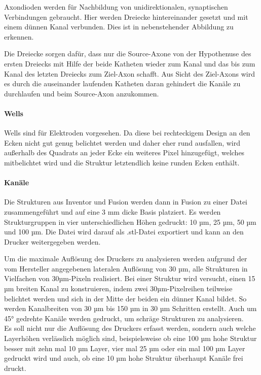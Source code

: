 Axondioden werden für Nachbildung von unidirektionalen, synaptischen Verbindungen gebraucht. Hier werden Dreiecke hintereinander gesetzt und mit einem dünnen Kanal verbunden. Dies ist in nebenstehender Abbildung zu erkennen.

Die Dreiecke sorgen dafür, dass nur die Source-Axone von der Hypothenuse des ersten Dreiecks mit Hilfe der beide Katheten wieder zum Kanal und das bis zum Kanal des letzten Dreiecks zum Ziel-Axon schafft. Aus Sicht des Ziel-Axons wird es durch die auseinander laufenden Katheten daran gehindert die Kanäle zu durchlaufen und beim Source-Axon anzukommen.\cite{Gladkov2017}

\paragraph{Wells\\}

Wells sind für Elektroden vorgesehen. Da diese bei rechteckigem Design an den Ecken nicht gut genug belichtet werden und daher eher rund ausfallen, wird außerhalb des Quadrats an jeder Ecke ein weiteres Pixel hinzugefügt, welches mitbelichtet wird und die Struktur letztendlich keine runden Ecken enthält.  

\paragraph{Kanäle\\}

Die Strukturen aus Inventor und Fusion werden dann in Fusion zu einer Datei zusammengeführt und auf eine 3 mm dicke Basis platziert. Es werden Strukturgruppen in vier unterschiedlichen Höhen gedruckt: 10 µm, 25 µm, 50 µm und 100 µm. Die Datei wird darauf als .stl-Datei exportiert und kann an den Drucker weitergegeben werden.

Um die maximale Auflösung des Druckers zu analysieren werden aufgrund der vom Hersteller angegebenen lateralen Auflösung von 30 µm, alle Strukturen in Vielfachen von 30µm-Pixeln realisiert. Bei einer Struktur wird versucht, einen 15 µm breiten Kanal zu konstruieren, indem zwei 30µm-Pixelreihen teilweise belichtet werden und sich in der Mitte der beiden ein dünner Kanal bildet. So werden Kanalbreiten von 30 µm bis 150 µm in 30 µm Schritten erstellt. Auch um 45° gedrehte Kanäle werden gedruckt, um schräge Strukturen zu analysieren. \\

Es soll nicht nur die Auflösung des Druckers erfasst werden, sondern auch welche Layerhöhen verlässlich möglich sind, beispielsweise ob eine 100 µm hohe Struktur besser mit zehn mal 10 µm Layer, vier mal 25 µm oder ein mal 100 µm Layer gedruckt wird und auch, ob eine 10 µm hohe Struktur überhaupt Kanäle frei druckt.

